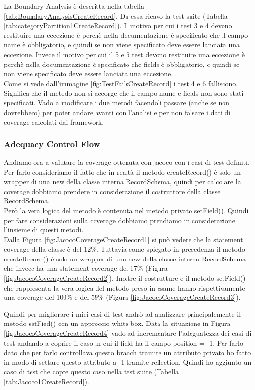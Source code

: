 \documentclass[12pt, a4paper]{article}
\begin{document}
La Boundary Analysis è descritta nella tabella \ref{tab:BoundaryAnalysisCreateRecord}. 
Da essa ricavo la test suite (Tabella \ref{tab:categoryPartition1CreateRecord}).
Il motivo per cui i test 3 e 4 devono restituire una eccezione è perchè nella documentazione è specificato che
il campo name è obbligatorio, e quindi se non viene specificato deve essere lanciata una eccezione.
Invece il motivo per cui il 5 e 6 test devono restituire una eccezione è perchè nella documentazione è specificato che
fields è obbligatorio, e quindi se non viene specificato deve essere lanciata una eccezione. \\
Come si vede dall'immagine \ref{fig:TestFailsCreateRecord} i test 4 e 6 falliscono. Significa che il metodo non si accorge
che il campo name e fields non sono stati specificati. 
Vado a modificare i due metodi facendoli passare (anche se non dovrebbero) per poter andare avanti con l'analisi e 
per non falsare i dati di coverage calcolati dai framework.

\subsubsection{Adequacy Control Flow}

Andiamo ora a valutare la coverage ottenuta con jacoco con i casi di test definiti. Per farlo consideriamo il fatto
che in realtà il metodo createRecord() è solo un wrapper di una new della classe interna RecordSchema, quindi per calcolare
la coverage dobbiamo prendere in considerazione il costruttore della classe RecordSchema. \\ Però la vera logica del metodo
è contenuta nel metodo privato setField(). Quindi per fare considerazioni sulla coverage dobbiamo prendiamo in considerazione 
l'insieme di questi metodi. \\
Dalla Figura \ref{fig:JacocoCoverageCreateRecord1} si può vedere che la statement coverage della classe è del 12\%. Tuttavia come 
spiegato in precedenza il metodo createRecord() è solo un wrapper di una new della classe interna RecordSchema che invece ha una
statement coverage del 17\% (Figura \ref{fig:JacocoCoverageCreateRecord2}). Inoltre il costrutture e il metodo setField() 
che rappresenta la vera logica del metodo preso in esame hanno rispettivamente una coverage del 100\% e del 59\% 
(Figura \ref{fig:JacocoCoverageCreateRecord3}).

Quindi per migliorare i miei casi di test andrò ad analizzare principalemente il metodo setFied() con un approccio white box.
Data la situazione in Figura \ref{fig:JacocoCoverageCreateRecord4} vado ad incrementare l'adeguatezza dei casi di test
andando a coprire il caso in cui il field ha il campo position = -1. Per farlo dato che per farlo controllava questo branch 
tramite un attributo privato ho fatto in modo di settare questo attributo a -1 tramite reflection.
Quindi ho aggiunto un caso di test che copre questo caso nella test suite (Tabella \ref{tab:Jacoco1CreateRecord}).
\end{document}
